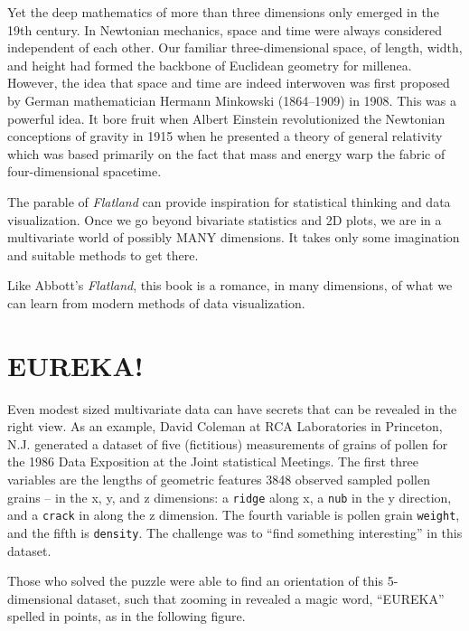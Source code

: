 \documentclass[
  letterpaper,
  10pt,
  krantz2]{krantz}
\begin{document}
Yet the deep mathematics of more than three dimensions only emerged in
the 19th century. In Newtonian mechanics, space and time were always
considered independent of each other. Our familiar three-dimensional
space, of length, width, and height had formed the backbone of Euclidean
geometry for millenea. However, the idea that space and time are indeed
interwoven was first proposed by German mathematician Hermann Minkowski
(1864--1909) in 1908. This was a powerful idea. It bore fruit when
Albert Einstein revolutionized the Newtonian conceptions of gravity in
1915 when he presented a theory of general relativity which was based
primarily on the fact that mass and energy warp the fabric of
four-dimensional spacetime.

The parable of \emph{Flatland} can provide inspiration for statistical
thinking and data visualization. Once we go beyond bivariate statistics
and 2D plots, we are in a multivariate world of possibly MANY
dimensions. It takes only some imagination and suitable methods to get
there.

Like Abbott's \emph{Flatland}, this book is a romance, in many
dimensions, of what we can learn from modern methods of data
visualization.

\hypertarget{eureka}{%
\section*{EUREKA!}\label{eureka}}


Even modest sized multivariate data can have secrets that can be
revealed in the right view. As an example, David Coleman at RCA
Laboratories in Princeton, N.J. generated a dataset of five (fictitious)
measurements of grains of pollen for the 1986 Data Exposition at the
Joint statistical Meetings. The first three variables are the lengths of
geometric features 3848 observed sampled pollen grains -- in the x, y,
and z dimensions: a \texttt{ridge} along x, a \texttt{nub} in the y
direction, and a \texttt{crack} in along the z dimension. The fourth
variable is pollen grain \texttt{weight}, and the fifth is
\texttt{density}. The challenge was to ``find something interesting'' in
this dataset.

Those who solved the puzzle were able to find an orientation of this
5-dimensional dataset, such that zooming in revealed a magic word,
``EUREKA'' spelled in points, as in the following figure.
\end{document}
